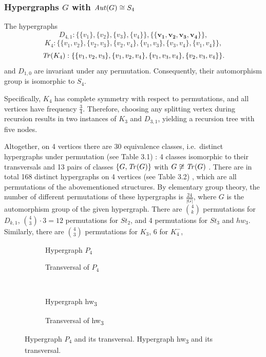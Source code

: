 \subsubsection*{Hypergraphs $G$ with $\mathit{Aut}(G)\cong S_4$}

The hypergraphs
\[
D_{4,1}:\{\{v_1\},\{v_2\},\{v_3\},\{v_4\}\},\{\{\mathbf{v_1},\mathbf{v_2},\mathbf{v_3},\mathbf{v_4}\}\},
\]
\[
K_4:\{\{v_1,v_2\},\{v_2,v_3\},\{v_2,v_4\},\{v_1,v_3\},\{v_3,v_4\},\{v_1,v_4\}\},
\]
\[
\mathit{Tr}(K_4):\{\{v_1,v_2,v_3\},\{v_1,v_2,v_4\},\{v_1,v_3,v_4\},\{v_2,v_3,v_4\}\}.
\]
and $D_{1,0}$ are invariant under any permutation. Consequently, their automorphism group is isomorphic to $S_4$.

Specifically, $K_4$ has complete symmetry with respect to permutations, and all vertices have frequency $\frac{3}{4}$. Therefore, choosing any splitting vertex during recursion results in two instances of $K_3$ and $D_{3,1}$, yielding a recursion tree with five nodes.

Altogether, on 4 vertices there are 30 equivalence classes, i.e.\ distinct hypergraphs under permutation (see Table 3.1) : 4 classes isomorphic to their transversals and 13 pairs of classes $\{G,\mathit{Tr}(G)\}$ with $G\not\cong\mathit{Tr}(G)$ . There are in total 168 distinct hypergraphs on 4 vertices (see Table 3.2) , which are all permutations of the abovementioned structures. By elementary group theory, the number of different permutations of these hypergraphs is $\frac{24}{|G|}$, where $G$ is the automorphism group of the given hypergraph. There are $\binom{4}{k}$ permutations for $D_{k,1}$, $\binom{4}{3}\cdot 3=12$ permutations for $St_2$, and 4 permutations for $St_3$ and $hw_3$. Similarly, there are $\binom{4}{3}$ permutations for $K_3$, 6 for $K_4^-$,

\begin{figure}[tp]
\centering
\begin{subfigure}{0.45\linewidth}\centering\caption{Hypergraph $P_4$}\end{subfigure}\hfill
\begin{subfigure}{0.45\linewidth}\centering\caption{Transversal of $P_4$}\end{subfigure}\\[8pt]
\begin{subfigure}{0.45\linewidth}\centering\caption{Hypergraph hw\textsubscript{3}}\end{subfigure}\hfill
\begin{subfigure}{0.45\linewidth}\centering\caption{Transversal of hw\textsubscript{3}}\end{subfigure}
\caption{Hypergraph $P_4$ and its transversal. Hypergraph hw\textsubscript{3} and its transversal.}\label{fig:p4-hw3}
\end{figure}

